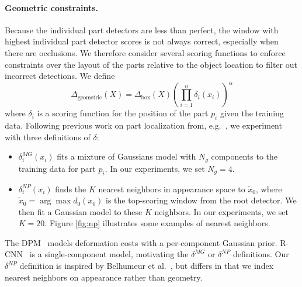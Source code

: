 \paragraph{Geometric constraints.}
Because the individual part detectors are less than perfect, the window with highest individual part detector scores is not always correct, especially when there are occlusions.
We therefore consider several scoring functions to enforce constraints over the layout of the parts relative to the object location to filter out incorrect detections.
We define
\begin{equation}
\Delta_{\mathrm{geometric}}(X) = \Delta_{\mathrm{box}}(X) \left( \prod_{i=1}^n \delta_i(x_i) \right)^{\alpha}
\end{equation}
where
$\delta_i$ is a scoring function for the position of the part $p_i$ given the training data. %
Following previous work on part localization from, e.g.~\cite{belkrieg,dpm,pictorial},
we experiment with three definitions of $\delta$:
\begin{itemize}

\item
$\delta_i^{MG}(x_i)$ fits a mixture of Gaussians model with $N_g$ components to the training data for part $p_i$.  In our experiments, we set $N_g = 4$.

\item
$\delta_i^{NP}(x_i)$ finds the $K$ nearest neighbors in appearance space to
$\tilde{x}_0$, where $\tilde{x}_0 = \arg \max d_0(x_0)$ is the top-scoring window from the root detector.
We then fit a Gaussian model to these $K$ neighbors.
In our experiments, we set $K = 20$. Figure \ref{fig:np} illustrates some examples of nearest neighbors. 
\end{itemize}

The DPM~\cite{dpm} models deformation costs with a per-component Gaussian prior. R-CNN~\cite{rcnn} is a single-component model, motivating the $\delta^{MG}$ or $\delta^{NP}$ definitions.
Our $\delta^{NP}$ definition is inspired by Belhumeur et al.~\cite{belkrieg}, but differs in that we index nearest neighbors on appearance rather than geometry.


